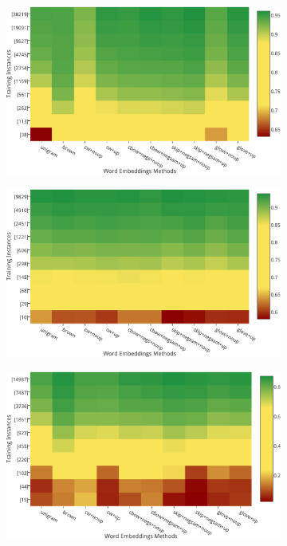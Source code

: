\begin{figure}
\centering
\begin{subfigure}{7cm}
	\centering
    \includegraphics[scale=0.4]{plots/map-pos-color-invert}    	
	\label{pos}
\end{subfigure}
\begin{subfigure}{7cm}
	\centering
    \includegraphics[scale=0.4]{plots/map-chunk-color-invert}
	\label{chu}
\end{subfigure}
\begin{subfigure}{7cm}
	\centering
    \includegraphics[scale=0.4]{plots/map-ner-color-invert}    	

\end{subfigure}
\end{figure}
